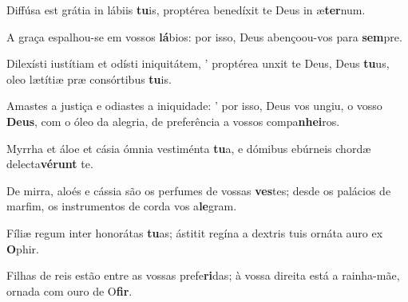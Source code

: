 \begin{greenumerate}
  \setcounter{enumi}{1}


  \item Diffúsa est grátia in lábiis \textbf{tu}is, {\GreStar} proptérea benedíxit te Deus in æ\textbf{ter}num. 

  \switchcolumn\setcounter{enumi}{1}

  \item A graça espalhou-se em vossos \textbf{lá}bios: {\GreStar} por isso, Deus abençoou-vos para \textbf{sem}pre. 

  \switchcolumn*


  \item Dilexísti iustítiam et odísti iniquitátem, {\large'} proptérea unxit te Deus, Deus \textbf{tu}us, {\GreStar} oleo lætítiæ præ consórtibus \textbf{tu}is. 

  \switchcolumn%

  \item Amastes a justiça e odiastes a iniquidade: {\large'} por isso, Deus vos ungiu, o vosso \textbf{Deus}, {\GreStar} com o óleo da alegria, de preferência a vossos compa\textbf{nhei}ros. 

  \switchcolumn*


  \item Myrrha et áloe et cásia ómnia vestiménta \textbf{tu}a, {\GreStar} e dómibus ebúrneis chordæ delecta\textbf{vérunt} te. 

  \switchcolumn%

  \item De mirra, aloés e cássia são os perfumes de vossas \textbf{ves}tes; {\GreStar} desde os palácios de marfim, os instrumentos de corda vos a\textbf{le}gram. 

  \switchcolumn*


  \item Fíliæ regum inter honorátas \textbf{tu}as; {\GreStar} ástitit regína a dextris tuis ornáta auro ex \textbf{O}phir. 

  \switchcolumn%

  \item Filhas de reis estão entre as vossas prefe\textbf{ri}das; {\GreStar} à vossa direita está a rainha-mãe, ornada com ouro de O\textbf{fir}. 


\end{greenumerate}
